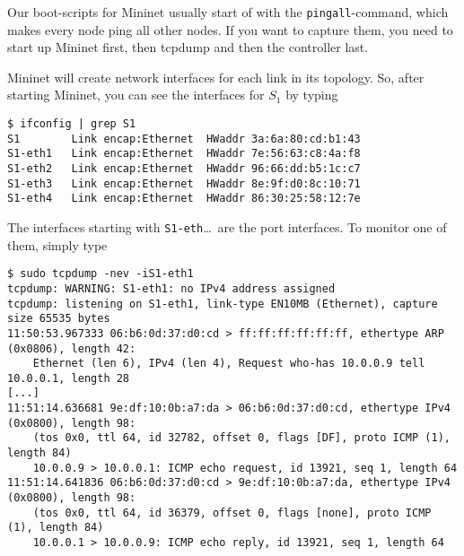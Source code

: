 Our boot-scripts for Mininet usually start of with the
\texttt{pingall}-command, which makes every node ping all other nodes.
If you want to capture them, you need to start up Mininet first, then
tcpdump and then the controller last.

Mininet will create network interfaces for each link in its topology.
So, after starting Mininet, you can see the interfaces for $S_1$ by typing

\begin{Verbatim}
$ ifconfig | grep S1
S1        Link encap:Ethernet  HWaddr 3a:6a:80:cd:b1:43
S1-eth1   Link encap:Ethernet  HWaddr 7e:56:63:c8:4a:f8
S1-eth2   Link encap:Ethernet  HWaddr 96:66:dd:b5:1c:c7
S1-eth3   Link encap:Ethernet  HWaddr 8e:9f:d0:8c:10:71
S1-eth4   Link encap:Ethernet  HWaddr 86:30:25:58:12:7e
\end{Verbatim}

The interfaces starting with \texttt{S1-eth}\dots~are the port interfaces.
To monitor one of them, simply type

\begin{Verbatim}[fontsize=\footnotesize]
$ sudo tcpdump -nev -iS1-eth1
tcpdump: WARNING: S1-eth1: no IPv4 address assigned
tcpdump: listening on S1-eth1, link-type EN10MB (Ethernet), capture size 65535 bytes
11:50:53.967333 06:b6:0d:37:d0:cd > ff:ff:ff:ff:ff:ff, ethertype ARP (0x0806), length 42:
    Ethernet (len 6), IPv4 (len 4), Request who-has 10.0.0.9 tell 10.0.0.1, length 28
[...]
11:51:14.636681 9e:df:10:0b:a7:da > 06:b6:0d:37:d0:cd, ethertype IPv4 (0x0800), length 98:
    (tos 0x0, ttl 64, id 32782, offset 0, flags [DF], proto ICMP (1), length 84)
    10.0.0.9 > 10.0.0.1: ICMP echo request, id 13921, seq 1, length 64
11:51:14.641836 06:b6:0d:37:d0:cd > 9e:df:10:0b:a7:da, ethertype IPv4 (0x0800), length 98:
    (tos 0x0, ttl 64, id 36379, offset 0, flags [none], proto ICMP (1), length 84)
    10.0.0.1 > 10.0.0.9: ICMP echo reply, id 13921, seq 1, length 64
\end{Verbatim}
